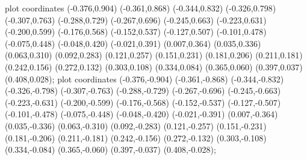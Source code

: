  plot coordinates {(-0.376,0.904) (-0.361,0.868) (-0.344,0.832) (-0.326,0.798) (-0.307,0.763) (-0.288,0.729) (-0.267,0.696) (-0.245,0.663) (-0.223,0.631) (-0.200,0.599) (-0.176,0.568) (-0.152,0.537) (-0.127,0.507) (-0.101,0.478) (-0.075,0.448) (-0.048,0.420) (-0.021,0.391) (0.007,0.364) (0.035,0.336) (0.063,0.310) (0.092,0.283) (0.121,0.257) (0.151,0.231) (0.181,0.206) (0.211,0.181) (0.242,0.156) (0.272,0.132) (0.303,0.108) (0.334,0.084) (0.365,0.060) (0.397,0.037) (0.408,0.028)};
 plot coordinates {(-0.376,-0.904) (-0.361,-0.868) (-0.344,-0.832) (-0.326,-0.798) (-0.307,-0.763) (-0.288,-0.729) (-0.267,-0.696) (-0.245,-0.663) (-0.223,-0.631) (-0.200,-0.599) (-0.176,-0.568) (-0.152,-0.537) (-0.127,-0.507) (-0.101,-0.478) (-0.075,-0.448) (-0.048,-0.420) (-0.021,-0.391) (0.007,-0.364) (0.035,-0.336) (0.063,-0.310) (0.092,-0.283) (0.121,-0.257) (0.151,-0.231) (0.181,-0.206) (0.211,-0.181) (0.242,-0.156) (0.272,-0.132) (0.303,-0.108) (0.334,-0.084) (0.365,-0.060) (0.397,-0.037) (0.408,-0.028)};
